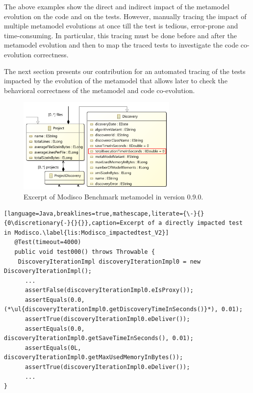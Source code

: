 {The above examples show the direct and indirect impact of the metamodel evolution on the code and on the tests. However, manually tracing the impact of multiple metamodel evolutions at once till the test is tedious, error-prone and time-consuming. In particular, this tracing must be done before and after the metamodel evolution and then to map the traced tests to investigate the code co-evolution correctness. 

The next section presents our contribution for an automated tracing of the tests impacted by the evolution of the metamodel that allows later to check the behavioral correctness of the metamodel and code co-evolution. 

}


\begin{figure}[tb]
\centering
\includegraphics[width=0.7\textwidth]{./pics/chapter2pics/excerptmodisco.png}

\caption{Excerpt of Modisco Benchmark metamodel in version 0.9.0.}
\label{fig:excerptmodisco}
\end{figure}





\begin{lstlisting}[language=Java,breaklines=true,mathescape,literate={\-}{}{0\discretionary{-}{}{}},caption=Excerpt of a directly impacted test in Modisco.\label{lis:Modisco_impactedtest_V2}]
   @Test(timeout=4000)
   public void test000() throws Throwable {
    DiscoveryIterationImpl discoveryIterationImpl0 = new DiscoveryIterationImpl();
      ...
      assertFalse(discoveryIterationImpl0.eIsProxy());
      assertEquals(0.0,  (*\ul{discoveryIterationImpl0.getDiscoveryTimeInSeconds()}*), 0.01);
      assertTrue(discoveryIterationImpl0.eDeliver());
      assertEquals(0.0, discoveryIterationImpl0.getSaveTimeInSeconds(), 0.01);
      assertEquals(0L, discoveryIterationImpl0.getMaxUsedMemoryInBytes());
      assertTrue(discoveryIterationImpl0.eDeliver());
      ...
}
    
    
\end{lstlisting}

